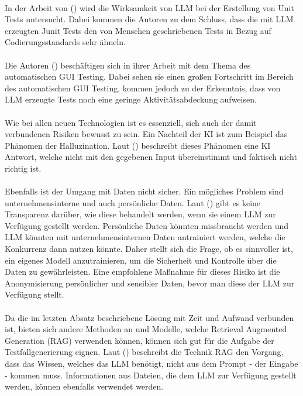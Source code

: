 \documentclass[12pt,toc=bib,toc=listof]{scrreprt}
\begin{document}
\\
In der Arbeit von (\cite{Ouédraogo2024}) wird die Wirksamkeit von LLM bei der Erstellung von Unit Tests untersucht. Dabei kommen die Autoren zu dem Schluss, dass die mit LLM erzeugten Junit Tests den von Menschen geschriebenen Tests in Bezug auf Codierungsstandards sehr ähneln.\\
\\
Die Autoren (\cite{Liu2024}) beschäftigen sich in ihrer Arbeit mit dem Thema des automatischen GUI Testing.
Dabei sehen sie einen großen Fortschritt im Bereich des automatischen GUI Testing, kommen jedoch zu der Erkenntnis, dass von LLM erzeugte Tests noch eine geringe Aktivitätsabdeckung aufweisen.\\
\\
Wie bei allen neuen Technologien ist es essenziell, sich auch der damit verbundenen Risiken bewusst zu sein. Ein Nachteil der KI ist zum Beispiel das Phänomen der Halluzination. Laut (\cite{Siebert2024}) beschreibt dieses Phänomen eine KI Antwort, welche nicht mit den gegebenen Input übereinstimmt und faktisch nicht richtig ist.\\
\\
Ebenfalls ist der Umgang mit Daten nicht sicher. Ein mögliches Problem sind unternehmensinterne und auch persönliche Daten. Laut (\cite{Möllers2024}) gibt es keine Transparenz darüber, wie diese behandelt werden, wenn sie einem LLM zur Verfügung gestellt werden. Persönliche Daten könnten missbraucht werden und LLM könnten mit unternehmensinternen Daten antrainiert werden, welche die Konkurrenz dann nutzen könnte. Daher stellt sich die Frage, ob es sinnvoller ist, ein eigenes Modell anzutrainieren, um die Sicherheit und Kontrolle über die Daten zu gewährleisten. Eine empfohlene Maßnahme für dieses Risiko ist die Anonymisierung persönlicher und sensibler Daten, bevor man diese der LLM zur Verfügung stellt.\\
\\
Da die im letzten Absatz beschriebene Lösung mit Zeit und Aufwand verbunden ist, bieten sich andere Methoden an und Modelle, welche Retrieval Augmented Generation (RAG) verwenden können, können sich gut für die Aufgabe der Testfallgenerierung eignen. Laut (\cite{Honroth2024}) beschreibt die Technik RAG den Vorgang, dass das Wissen, welches das LLM benötigt, nicht aus dem Prompt - der Eingabe - kommen muss. Informationen aus Dateien, die dem LLM zur Verfügung gestellt werden, können ebenfalls verwendet werden.
\end{document}
